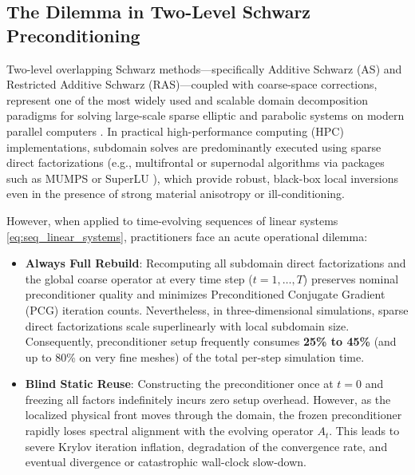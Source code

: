 \documentclass[preprint,12pt,3p]{elsarticle}
\begin{document}
\subsection{The Dilemma in Two-Level Schwarz Preconditioning}
Two-level overlapping Schwarz methods---specifically Additive Schwarz (AS) and Restricted Additive Schwarz (RAS)---coupled with coarse-space corrections, represent one of the most widely used and scalable domain decomposition paradigms for solving large-scale sparse elliptic and parabolic systems on modern parallel computers \cite{toselli2005domain, doval2008domain, smith1996domain}. In practical high-performance computing (HPC) implementations, subdomain solves are predominantly executed using sparse direct factorizations (e.g., multifrontal or supernodal algorithms via packages such as MUMPS \cite{amestoy2001fully} or SuperLU \cite{li2005overview}), which provide robust, black-box local inversions even in the presence of strong material anisotropy or ill-conditioning.

However, when applied to time-evolving sequences of linear systems \eqref{eq:seq_linear_systems}, practitioners face an acute operational dilemma:
\begin{itemize}
    \item \textbf{Always Full Rebuild}: Recomputing all subdomain direct factorizations and the global coarse operator at every time step ($t=1, \dots, T$) preserves nominal preconditioner quality and minimizes Preconditioned Conjugate Gradient (PCG) iteration counts. Nevertheless, in three-dimensional simulations, sparse direct factorizations scale superlinearly with local subdomain size. Consequently, preconditioner setup frequently consumes \textbf{25\% to 45\%} (and up to 80\% on very fine meshes) of the total per-step simulation time.
    \item \textbf{Blind Static Reuse}: Constructing the preconditioner once at $t=0$ and freezing all factors indefinitely incurs zero setup overhead. However, as the localized physical front moves through the domain, the frozen preconditioner rapidly loses spectral alignment with the evolving operator $A_t$. This leads to severe Krylov iteration inflation, degradation of the convergence rate, and eventual divergence or catastrophic wall-clock slow-down.
\end{itemize}
\end{document}
